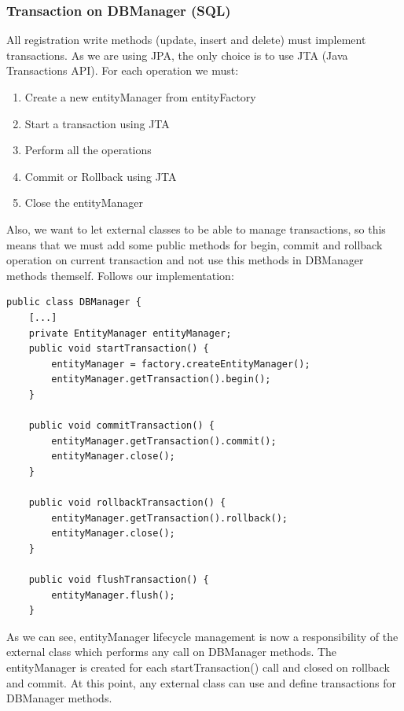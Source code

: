 \documentclass{report}
\begin{document}
\subsubsection{Transaction on DBManager (SQL)}
All registration write methods (update, insert and delete) must implement transactions. As we are using JPA, the only choice is to use JTA (Java Transactions API). For each operation we must:
\begin{enumerate}
	\item Create a new entityManager from entityFactory
	\item Start a transaction using JTA
	\item Perform all the operations
	\item Commit or Rollback using JTA
	\item Close the entityManager
\end{enumerate}
Also, we want to let external classes to be able to manage transactions, so this means that we must add some public methods for begin, commit and rollback operation on current transaction and not use this methods in DBManager methods themself. Follows our implementation:
\begin{lstlisting}
public class DBManager {
	[...]
	private EntityManager entityManager;
	public void startTransaction() {
		entityManager = factory.createEntityManager();
		entityManager.getTransaction().begin();
	}

	public void commitTransaction() {
		entityManager.getTransaction().commit();
		entityManager.close();
	}

	public void rollbackTransaction() {
		entityManager.getTransaction().rollback();
		entityManager.close();
	}

	public void flushTransaction() {
		entityManager.flush();
	}
\end{lstlisting}
As we can see, entityManager lifecycle management is now a responsibility of the external class which performs any call on DBManager methods. The entityManager is created for each startTransaction() call and closed on rollback and commit.
At this point, any external class can use and define transactions for DBManager methods.

\end{document}
